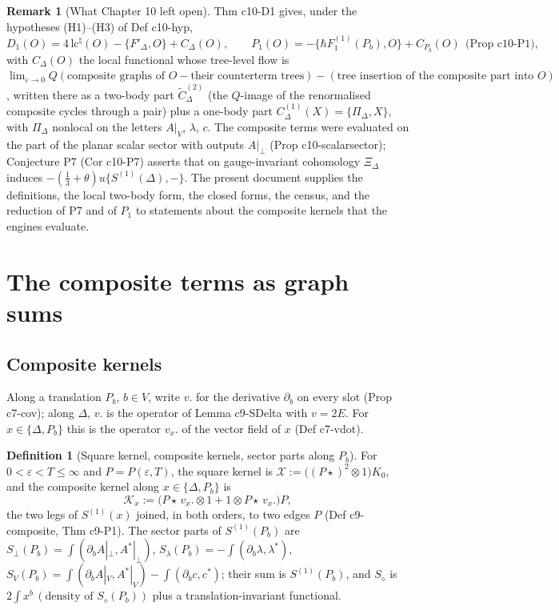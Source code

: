 \documentclass[11pt]{article}
\numberwithin{equation}{section}
\theoremstyle{plain}
\theoremstyle{definition}
\newtheorem{definition}[theorem]{Definition}
\newtheorem{remark}[theorem]{Remark}
\newcommand{\Ap}{A|_{\perp}}
\newcommand{\AV}{A|_V}
\begin{document}
\begin{remark}[What Chapter 10 left open]
\label{rem:cc-open}
Thm c10-D1 gives, under the hypotheses (H1)--(H3) of Def c10-hyp,
\begin{equation}
D_1(O)=4\,\mathrm{lc}^\natural(O)-\{F'_\Delta,O\}+C_\Delta(O),\qquad P_1(O)=-\{\hbar F_1^{(1)}(P_b),O\}+C_{P_b}(O)\ \ \text{(Prop c10-P1)},
\label{eq:cc-D1}
\end{equation}
with $C_\Delta(O)$ the local functional whose tree-level flow is $\lim_{\varepsilon\to0}Q(\text{composite graphs of }O-\text{their counterterm trees})-(\text{tree insertion of the composite part into }O)$, written there as a two-body part $\widetilde C^{(2)}_\Delta$ (the $Q$-image of the renormalised composite cycles through a pair) plus a one-body part $C^{(1)}_\Delta(X)=\{\Pi_\Delta,X\}$, with $\Pi_\Delta$ nonlocal on the letters $\AV$, $\lambda$, $c$. The composite terms were evaluated on the part of the planar scalar sector with outputs $\Ap$ (Prop c10-scalarsector); Conjecture P7 (Cor c10-P7) asserts that on gauge-invariant cohomology $\Xi_\Delta$ induces $-(\tfrac13+\theta)u\{S^{(1)}(\Delta),-\}$. The present document supplies the definitions, the local two-body form, the closed forms, the census, and the reduction of P7 and of $P_1$ to statements about the composite kernels that the engines evaluate.
\end{remark}

\section{The composite terms as graph sums}
\label{sec:cc-def}

\subsection{Composite kernels}

Along a translation $P_b$, $b\in V$, write $v.$ for the derivative $\partial_b$ on every slot (Prop c7-cov); along $\Delta$, $v.$ is the operator of Lemma c9-SDelta with $v=2E$. For $x\in\{\Delta,P_b\}$ this is the operator $v_x.$ of the vector field of $x$ (Def c7-vdot).

\begin{definition}[Square kernel, composite kernels, sector parts along $P_b$]
\label{def:cc-kernels}
For $0<\varepsilon<T\le\infty$ and $P=P(\varepsilon,T)$, the square kernel is $\mathcal X:=\big((P\star)^2\otimes1\big)K_0$, and the composite kernel along $x\in\{\Delta,P_b\}$ is
\[
\mathcal K_x:=\big(P\star\,v_x.\otimes1+1\otimes P\star\,v_x.\big)P,
\]
the two legs of $S^{(1)}(x)$ joined, in both orders, to two edges $P$ (Def c9-composite, Thm c9-P1). The sector parts of $S^{(1)}(P_b)$ are $S_\perp(P_b)=\int(\partial_b\Ap,A^*|_\perp)$, $S_\lambda(P_b)=-\int(\partial_b\lambda,\lambda^*)$, $S_V(P_b)=\int(\partial_b\AV,A^*|_V)-\int(\partial_bc,c^*)$; their sum is $S^{(1)}(P_b)$, and $S_\diamond$ is $2\int x^b\,(\text{density of }S_\diamond(P_b))$ plus a translation-invariant functional.
\end{definition}
\end{document}
